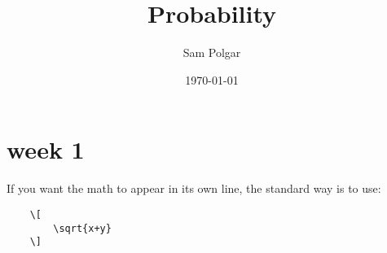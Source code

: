 \documentclass[10pt]{article}
\begin{document}
\title{Probability}

\author{%
   Sam Polgar%
}

\date{\today}

\maketitle

\section{week 1}


% 








If you want the math to appear in its own line, the standard way is to use:

\begin{verbatim}
    \[
        \sqrt{x+y}
    \]
\end{verbatim}




%    
%    
\end{document}
